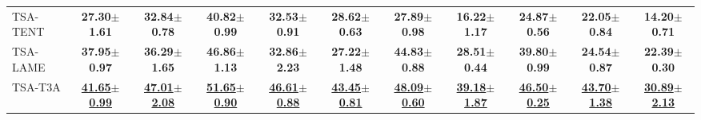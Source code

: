 \begin{table*}[t]
\begin{center}
\begin{adjustbox}{width = 1\textwidth}
\begin{tabular}{lcccccccccc}
\midrule
TSA-TENT
& \textbf{27.30$\pm$1.61} & \textbf{32.84$\pm$0.78} & \textbf{40.82$\pm$0.99} & \textbf{32.53$\pm$0.91} & \textbf{28.62$\pm$0.63} & \textbf{27.89$\pm$0.98} & \textbf{16.22$\pm$1.17} & \textbf{24.87$\pm$0.56} & \textbf{22.05$\pm$0.84} & \textbf{14.20$\pm$0.71}
\\
TSA-LAME
& \textbf{37.95$\pm$0.97} & \textbf{36.29$\pm$1.65} & \textbf{46.86$\pm$1.13} & \textbf{32.86$\pm$2.23} & \textbf{27.22$\pm$1.48} & \textbf{44.83$\pm$0.88} & \textbf{28.51$\pm$0.44} & \textbf{39.80$\pm$0.99} & \textbf{24.54$\pm$0.87} & \textbf{22.39$\pm$0.30}
\\
TSA-T3A
& \underline{\textbf{41.65$\pm$0.99}} & \underline{\textbf{47.01$\pm$2.08}} & \underline{\textbf{51.65$\pm$0.90}} & \underline{\textbf{46.61$\pm$0.88}} & \underline{\textbf{43.45$\pm$0.81}} & \underline{\textbf{48.09$\pm$0.60}} & \underline{\textbf{39.18$\pm$1.87}} & \underline{\textbf{46.50$\pm$0.25}} & \underline{\textbf{43.70$\pm$1.38}} & \underline{\textbf{30.89$\pm$2.13}}
\\
\bottomrule
\end{tabular}
\end{adjustbox}
\end{center}
\vspace{-2mm}
\end{table*}



